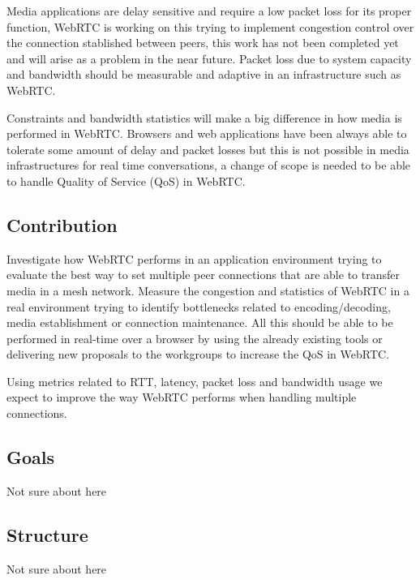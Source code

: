 Media applications are delay sensitive and require a low packet loss for its proper function, WebRTC is working on this trying to implement congestion control over the connection stablished between peers, this work has not been completed yet and will arise as a problem in the near future. Packet loss due to system capacity and bandwidth should be measurable and adaptive in an infrastructure such as WebRTC.

Constraints and bandwidth statistics will make a big difference in how media is performed in WebRTC. Browsers and web applications have been always able to tolerate some amount of delay and packet losses but this is not possible in media infrastructures for real time conversations, a change of scope is needed to be able to handle Quality of Service (QoS) in WebRTC.

\subsection{Contribution}

Investigate how WebRTC performs in an application environment trying to evaluate the best way to set multiple peer connections that are able to transfer media in a mesh network. Measure the congestion and statistics of WebRTC in a real environment trying to identify bottlenecks related to encoding/decoding, media establishment or connection maintenance. All this should be able to be performed in real-time over a browser by using the already existing tools or delivering new proposals to the workgroups to increase the QoS in WebRTC.

Using metrics related to RTT, latency, packet loss and bandwidth usage we expect to improve the way WebRTC performs when handling multiple connections.

\subsection{Goals}

Not sure about here

\subsection{Structure}

Not sure about here